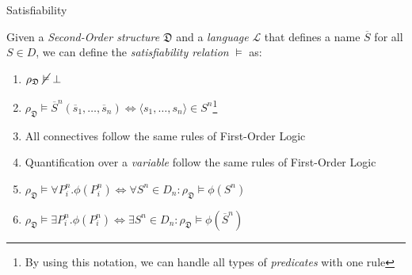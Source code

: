 \documentclass{beamer}
\begin{document}
            \begin{frame}{Satisfiability}
                \begin{definition}
                    Given a \textit{Second-Order structure} $ \mathfrak{D} $ and a \textit{language} $ \mathcal{L} $ that defines a name $ \overline{S} $ for all $ S \in D $, we can define the \textit{satisfiability relation} $ \vDash $ as:
                    \begin{enumerate}
                        \item $ \rho_\mathfrak{D}\; \cancel{\vDash}\; \bot $
                        \item $ \rho_\mathfrak{D} \vDash \overline{S}^n(\overline{s}_1, \dots, \overline{s}_n) \Leftrightarrow \langle s_1, \dots, s_n \rangle \in S^n $\footnote{By using this notation, we can handle all types of \textit{predicates} with one rule}
                        \item All connectives follow the same rules of First-Order Logic
                        \item Quantification over a \textit{variable} follow the same rules of First-Order Logic
                        \item $ \rho_\mathfrak{D} \vDash \forall P^n_i. \phi(P^n_i) \Leftrightarrow \forall S^n \in D_n: \rho_\mathfrak{D} \vDash \phi(S^n) $
                        \item $ \rho_\mathfrak{D} \vDash \exists P^n_i. \phi(P^n_i) \Leftrightarrow \exists S^n \in D_n: \rho_\mathfrak{D} \vDash \phi(\overline{S}^n) $
                    \end{enumerate}
                \end{definition}
            \end{frame}
            
\end{document}
